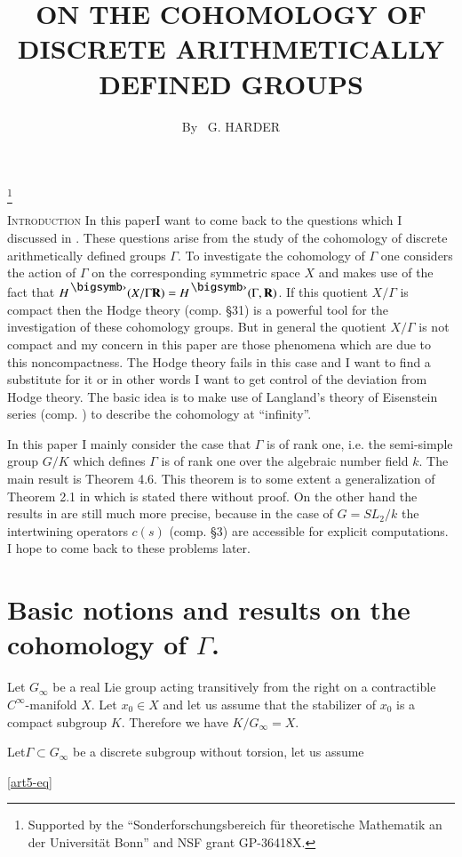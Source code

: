 
\title{ON THE COHOMOLOGY OF DISCRETE ARITHMETICALLY DEFINED GROUPS}\footnote{Supported by the ``Sonderforschungsbereich f\"ur theoretische Mathematik an der Universit\"at Bonn'' and NSF grant GP-36418X.}

\author{By~ G. HARDER} 

\date{}
\maketitle


\setcounter{pageoriginal}{128}

\textsc{Introduction}
In this paper\pageoriginale I want to come back to the questions which I discussed in \cite{art5-key7}. These questions arise from the study of the cohomology of discrete arithmetically defined groups $\Gamma$. To investigate the cohomology of $\Gamma$ one considers the action of $\Gamma$ on the corresponding symmetric space $X$ and makes use of the fact that $H^\bigdot (X / \Gamma \bR) = H^\bigdot (\Gamma, \bR)$. If this quotient $X / \Gamma$ is compact then the Hodge theory (comp. \cite{art5-key12} \S 31) is a powerful tool for the investigation of these cohomology groups. But in general the quotient $X/ \Gamma$ is not compact and my concern in this paper are those phenomena which are due to this noncompactness. The Hodge theory fails in this case and I want to find a substitute for it or in other words I want to get control of the deviation from Hodge theory. The basic idea is to make use of Langland's theory of Eisenstein series (comp. \cite{art5-key8}) to describe the cohomology at ``infinity''.

In this paper I mainly consider the case that $\Gamma$ is of rank one, i.e. the semi-simple group $G/ K$ which defines $\Gamma$ is of rank one over the algebraic number field $k$. The main result is Theorem 4.6. This theorem is to some extent a generalization of Theorem 2.1 in \cite{art5-key7} which is stated there without proof. On the other hand the results in \cite{art5-key7} are still much more precise, because in the case of $G = S L_2 / k$ the intertwining operators $c (s)$ (comp. \S 3) are accessible for explicit computations. I hope to come back to these problems later.

\section{Basic notions and results on the cohomology of $\Gamma$.}\label{art5-sec1}

Let $G_\infty$ be a real Lie group acting transitively from the right on a contractible $C^\infty$-manifold $X$. Let $x_0 \in X$ and let us assume that the stabilizer of $x_0$ is a compact subgroup $K$. Therefore we have $K / G_\infty = X$. 

Let\pageoriginale $\Gamma \subset G_\infty$ be a discrete subgroup without torsion, let us assume



\eqref{art5-eq}




